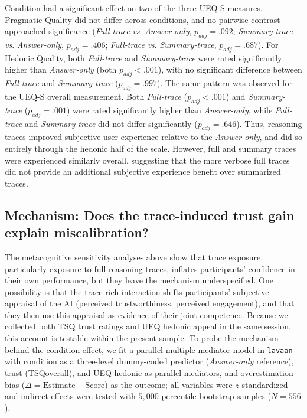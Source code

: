 \documentclass[manuscript,review,anonymous]{acmart}
\begin{document}
Condition had a significant effect on two of the three UEQ-S measures. Pragmatic Quality did not differ across conditions, and no pairwise contrast approached significance (\textit{Full-trace} \textit{vs}. \textit{Answer-only}, $p_{adj} = .092$; \textit{Summary-trace} \textit{vs}. \textit{Answer-only}, $p_{adj} = .406$; \textit{Full-trace} \textit{vs}. \textit{Summary-trace}, $p_{adj} = .687$). For Hedonic Quality, both \textit{Full-trace} and \textit{Summary-trace} were rated significantly higher than \textit{Answer-only} (both $p_{adj} < .001$), with no significant difference between \textit{Full-trace} and \textit{Summary-trace} ($p_{adj} = .997$). The same pattern was observed for the UEQ-S overall measurement. Both \textit{Full-trace} ($p_{adj} < .001$) and \textit{Summary-trace} ($p_{adj} = .001$) were rated significantly higher than \textit{Answer-only}, while \textit{Full-trace} and \textit{Summary-trace} did not differ significantly ($p_{adj} = .646$).
Thus, reasoning traces improved subjective user experience relative to the \textit{Answer-only}, and did so entirely through the hedonic half of the scale. However, full and summary traces were experienced similarly overall, suggesting that the more verbose full traces did not provide an additional subjective experience benefit over summarized traces.

\subsection{Mechanism: Does the trace-induced trust gain explain miscalibration?}
\label{sec:mediation}
The metacognitive sensitivity analyses above show that trace exposure, particularly exposure to full reasoning traces, inflates participants' confidence in their own performance, but they leave the mechanism underspecified.
One possibility is that the trace-rich interaction shifts participants' subjective appraisal of the AI (perceived trustworthiness, perceived engagement), and that they then use this appraisal as evidence of their joint competence. Because we collected both TSQ trust ratings and UEQ hedonic appeal in the same session, this account is testable within the present sample.
To probe the mechanism behind the condition effect, we fit a parallel multiple-mediator model in \texttt{lavaan} with condition as a three-level dummy-coded predictor (\textit{Answer-only} reference), trust (TSQoverall), and UEQ hedonic as parallel mediators, and overestimation bias ($\Delta = \mathrm{Estimate} - \mathrm{Score}$) as the outcome; all variables were $z$-standardized and indirect effects were tested with $5{,}000$ percentile bootstrap samples ($N = 556$).
\end{document}
